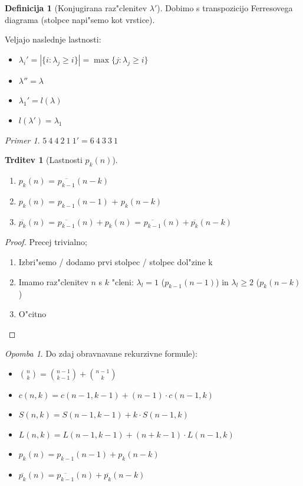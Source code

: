 \documentclass[a4paper,12pt]{article}
\theoremstyle{definition}
\newtheorem{defn}[counter]{Definicija}
\newtheorem{claim}[counter]{Trditev}
\theoremstyle{remark}
\newtheorem*{ex}{Primer}
\newtheorem*{rem}{Opomba}
\begin{document}
\begin{defn} [Konjugirana raz"clenitev $\lambda '$]
	Dobimo s transpozicijo Ferresovega diagrama (stolpce napi"semo kot vrstice).
\end{defn}
Veljajo naslednje lastnosti:
\begin{itemize}
	\item $\lambda_i ' = |\{i: \lambda_j \geqslant i\}| = \max\{j: \lambda_j \geqslant i\}$
	\item $\lambda '' = \lambda$
	\item $\lambda_1 ' = l(\lambda)$
	\item $l(\lambda ') = \lambda_1$
\end{itemize}
\begin{ex}
	$5 \ 4 \ 4 \ 2 \ 1 \ 1 ' = 6 \ 4 \ 3 \ 3 \ 1$
\end{ex}

\begin{claim}[Lastnosti $p_k(n)$]\mbox{}
	\begin{enumerate}
	    \item $p_k(n)$ = $\overline{p_{k - 1}} (n - k)$
	    \item $p_k(n)$ = $p_{k - 1} (n - 1)$ + $p_k (n - k)$
	    \item $\overline{p_{k}}(n)$ = $\overline{p_{k - 1}}(n) + p_k (n)$ = $\overline{p_{k - 1}}(n) + \overline{p_k} (n - k)$
	\end{enumerate}
\end{claim}

\begin{proof}
	Precej trivialno;
    \begin{enumerate}
        \item Izbri"semo / dodamo prvi stolpec / stolpec dol"zine k
        \item Imamo raz"clenitev $n$ s $k$ "cleni: $\lambda_l = 1$ ($p_{k - 1}(n - 1)$) in $\lambda_l \geqslant 2$ ($p_k(n - k)$)
        \item O"citno
    \end{enumerate}
\end{proof}

\begin{rem}
	Do zdaj obravnavane rekurzivne formule):\\
	\begin{itemize}
	    \item $\binom{n}{k} = \binom{n - 1}{k - 1} + \binom{n - 1}{k}$
	    \item $c(n, k) = c(n - 1, k - 1) + (n - 1)\cdot c(n - 1, k)$
	    \item $S(n, k) = S(n - 1, k - 1) + k\cdot S(n - 1, k)$
	    \item $L(n, k) = L(n - 1, k - 1) + (n + k - 1)\cdot L(n - 1, k)$
	    \item $p_k(n) = p_{k - 1}(n - 1) + p_k (n - k)$
	    \item $\overline{p_k}(n) = \overline{p_{k - 1}}(n) + \overline{p_k}(n - k)$
	\end{itemize}
\end{rem}
\end{document}
